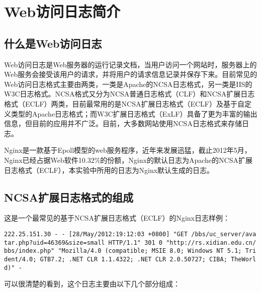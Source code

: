 	
\section{Web访问日志简介}
\subsection{什么是Web访问日志}
Web访问日志是Web服务器的运行记录文档，当用户访问一个网站时，服务器上的Web服务会接受该用户的请求，并将用户的请求信息记录并保存下来。目前常见的Web访问日志格式主要由两类，一类是Apache的NCSA日志格式，另一类是IIS的W3C日志格式。NCSA格式又分为NCSA普通日志格式（CLF）和NCSA扩展日志格式（ECLF）两类，目前最常用的是NCSA扩展日志格式（ECLF）及基于自定义类型的Apache日志格式；而W3C扩展日志格式（ExLF）具备了更为丰富的输出信息，但目前的应用并不广泛。目前，大多数网站使用NCSA日志格式来存储日志。

Nginx是一款基于Epoll模型的web服务程序，近年来发展迅猛，截止2012年5月，Nginx已经占据Web软件10.32\%的份额\cite{site:netcraft_nginx}，Nginx的默认日志为Apache的NCSA扩展日志格式（ECLF），本实验中所用的日志为Nginx默认生成的日志。

\subsection{NCSA扩展日志格式的组成}
这是一个最常见的基于NCSA扩展日志格式（ECLF）的Nginx日志样例：

\begin{verbatim}
222.25.151.30 - - [28/May/2012:19:12:03 +0800] "GET /bbs/uc_server/ava
tar.php?uid=46369&size=small HTTP/1.1" 301 0 "http://rs.xidian.edu.cn/
bbs/index.php" "Mozilla/4.0 (compatible; MSIE 8.0; Windows NT 5.1; Tri
dent/4.0; GTB7.2; .NET CLR 1.1.4322; .NET CLR 2.0.50727; CIBA; TheWorl
d)" -
\end{verbatim}

可以很清楚的看到，这个日志主要由以下几个部分组成：

